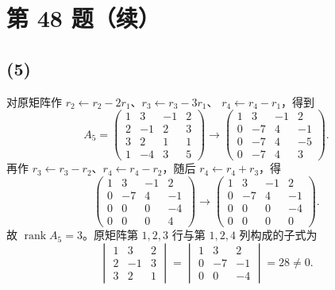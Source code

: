 \documentclass[11pt,a4paper,fontset=fandol]{ctexart}
\newcommand{\rk}{\operatorname{rank}}
\newcommand{\ans}[1]{\boxed{#1}}
\newcommand{\parttitle}[1]{\Needspace{7\baselineskip}\subsection*{#1}}
\begin{document}
\section*{第 48 题（续）}
\parttitle{(5)}
对原矩阵作 $r_2\leftarrow r_2-2r_1$、$r_3\leftarrow r_3-3r_1$、
$r_4\leftarrow r_4-r_1$，得到
\[
A_5=\begin{pmatrix}1&3&-1&2\\2&-1&2&3\\3&2&1&1\\1&-4&3&5\end{pmatrix}
\longrightarrow
\begin{pmatrix}1&3&-1&2\\0&-7&4&-1\\0&-7&4&-5\\0&-7&4&3\end{pmatrix}.
\]
再作 $r_3\leftarrow r_3-r_2$、$r_4\leftarrow r_4-r_2$，随后 $r_4\leftarrow r_4+r_3$，得
\[
\begin{pmatrix}1&3&-1&2\\0&-7&4&-1\\0&0&0&-4\\0&0&0&4\end{pmatrix}
\longrightarrow
\begin{pmatrix}1&3&-1&2\\0&-7&4&-1\\0&0&0&-4\\0&0&0&0\end{pmatrix}.
\]
故 $\ans{\rk A_5=3}$。原矩阵第 $1,2,3$ 行与第 $1,2,4$ 列构成的子式为
\[
\ans{\begin{vmatrix}1&3&2\\2&-1&3\\3&2&1\end{vmatrix}
=\begin{vmatrix}1&3&2\\0&-7&-1\\0&0&-4\end{vmatrix}=28\ne0}.
\]
\end{document}
